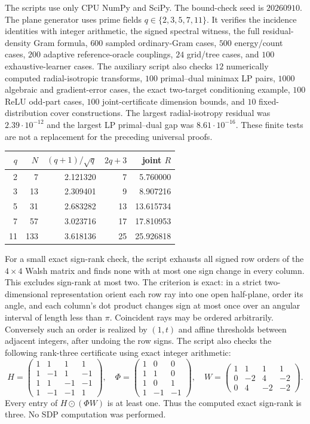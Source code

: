 \documentclass[11pt]{article}
\newcommand{\1}{\mathbf 1}
\begin{document}
The scripts use only CPU NumPy and SciPy. The bound-check seed is $20260910$. The plane generator uses prime fields $q\in\{2,3,5,7,11\}$. It verifies the incidence identities with integer arithmetic, the signed spectral witness, the full residual-density Gram formula, $600$ sampled ordinary-Gram cases, $500$ energy/count cases, $200$ adaptive reference-oracle couplings, $24$ grid/tree cases, and $100$ exhaustive-learner cases. The auxiliary script also checks $12$ numerically computed radial-isotropic transforms, $100$ primal--dual minimax LP pairs, $1000$ algebraic and gradient-error cases, the exact two-target conditioning example, $100$ ReLU odd-part cases, $100$ joint-certificate dimension bounds, and $10$ fixed-distribution cover constructions. The largest radial-isotropy residual was $2.39\cdot10^{-12}$ and the largest LP primal--dual gap was $8.61\cdot10^{-16}$. These finite tests are not a replacement for the preceding universal proofs.

\begin{center}
\begin{tabular}{rrrrr}
\toprule
$q$ & $N$ & $(q+1)/\sqrt q$ & $2q+3$ & joint $R$\\
\midrule
2&7&2.121320&7&5.760000\\
3&13&2.309401&9&8.907216\\
5&31&2.683282&13&13.615734\\
7&57&3.023716&17&17.810953\\
11&133&3.618136&25&25.926818\\
\bottomrule
\end{tabular}
\end{center}

For a small exact sign-rank check, the script exhausts all signed row orders of the $4\times4$ Walsh matrix and finds none with at most one sign change in every column. This excludes sign-rank at most two. The criterion is exact: in a strict two-dimensional representation orient each row ray into one open half-plane, order its angle, and each column's dot product changes sign at most once over an angular interval of length less than $\pi$. Coincident rays may be ordered arbitrarily. Conversely such an order is realized by $(1,t)$ and affine thresholds between adjacent integers, after undoing the row signs. The script also checks the following rank-three certificate using exact integer arithmetic:
\[
 H=\begin{pmatrix}1&1&1&1\\1&-1&1&-1\\1&1&-1&-1\\1&-1&-1&1\end{pmatrix},\quad
 \Phi=\begin{pmatrix}1&0&0\\1&1&0\\1&0&1\\1&-1&-1\end{pmatrix},\quad
 W=\begin{pmatrix}1&1&1&1\\0&-2&4&-2\\0&4&-2&-2\end{pmatrix}.
\]
Every entry of $H\odot(\Phi W)$ is at least one. Thus the computed exact sign-rank is three. No SDP computation was performed.
\end{document}
